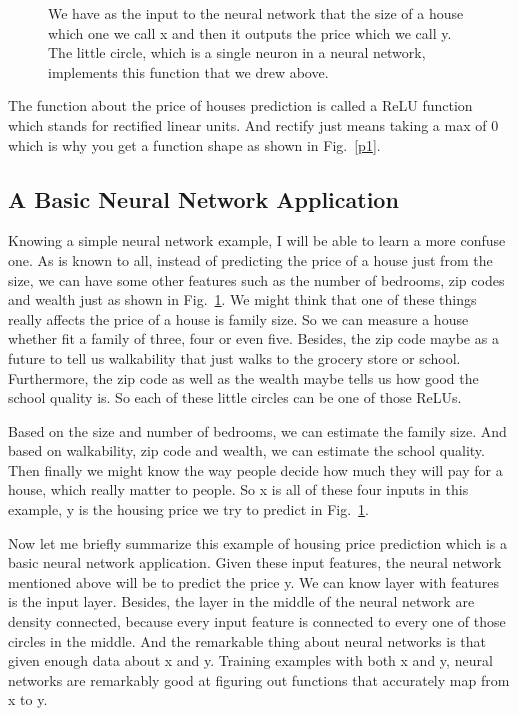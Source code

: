 \documentclass[a4paper]{article}
\begin{document}
\begin{figure}
	\centering 
	\caption{We have as the input to the neural network that the size of a house which one we call x and then it outputs the price which we call y. The little circle, which is a single neuron in a neural network, implements this function that we drew above. } 
	\label{p2} 
\end{figure}

The function about the price of houses prediction is called a ReLU function which stands for rectified linear units. And rectify just means taking a max of 0 which is why you get a function shape as shown in Fig.~\ref{p1}. 

\subsection{A Basic Neural Network Application}
Knowing a simple neural network example, I will be able to learn a more confuse one. As is known to all, instead of predicting the price of a house just from the size, we can have some other features such as the number of bedrooms, zip codes and wealth just as shown in Fig.~\ref{p2}. We might think that one of these things really affects the price of a house is family size. So we can measure a house whether fit a family of three, four or even five. Besides, the zip code maybe as a future to tell us walkability that just walks to the grocery store or school. Furthermore, the zip code as well as the wealth maybe tells us how good the school quality is. So each of these little circles can be one of those ReLUs. 

Based on the size and number of bedrooms, we can estimate the family size. And based on walkability, zip code and wealth, we can estimate the school quality. Then finally we might know the way people decide how much they will pay for a house, which really matter to people. So x is all of these four inputs in this example, y is the housing price we try to predict in Fig.~\ref{p2}.

Now let me briefly summarize this example of housing price prediction which is a basic neural network application. Given these input features, the neural network mentioned above will be to predict the price y. We can know layer with features is the input layer. Besides, the layer in the middle of the neural network are density connected, because every input feature is connected to every one of those circles in the middle. And the remarkable thing about neural networks is that given enough data about x and y. Training examples with both x and y, neural networks are remarkably good at figuring out functions that accurately map from x to y. 
\end{document}
